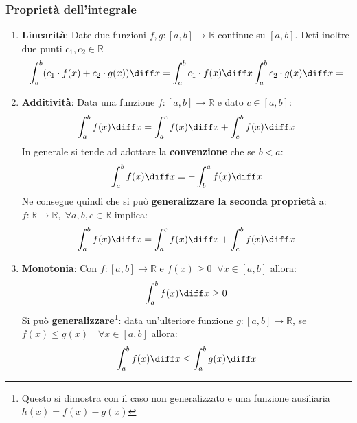 \subsubsection{Proprietà dell'integrale}
\begin{enumerate}
	\item \textbf{Linearità}: Date due funzioni $f,g:[a,b] \to \mathbb{R}$ 
        continue su $[a,b]$. Deti inoltre due punti $c_1, c_2 \in \mathbb{R}$
		\begin{equation*}
			\int_a^b (c_1 \cdot f(x) + c_2 \cdot g(x)) \diff x = \int_a^b c_1 
            \cdot f(x) \diff x \int_a^b c_2 \cdot g(x) \diff x = 
		\end{equation*}

	\item \textbf{Additività}: Data una funzione $f:[a,b] \to \mathbb{R}$ e dato 
        $c \in [a,b]$:
		\begin{equation*}
			\int_a^b f(x) \diff x = \int_a^c f(x) \diff x + \int_c^b f(x) 
            \diff x
		\end{equation*}
		In generale si tende ad adottare la \textbf{convenzione} che se 
        $b < a$:
		\begin{equation*}
			\int_a^b f(x) \diff x = -\int_b^a f(x) \diff x
		\end{equation*}
		Ne consegue quindi che si può \textbf{generalizzare la seconda 
        proprietà} a: $f:\mathbb{R} \to \mathbb{R},\; \forall a,b,c \in 
        \mathbb{R}$ implica:
		\begin{equation*}
			\int_a^b f(x) \diff x = \int_a^c f(x) \diff x + \int_c^b f(x) 
            \diff x 
		\end{equation*}

  \item \textbf{Monotonia}: Con $f:[a,b] \to \mathbb{R}$ e $f(x) \geq 0 \;\; 
    \forall x \in [a,b]$ allora:
		\begin{equation*}
			\int_a^b f(x) \diff x \geq 0
		\end{equation*}
		Si può \textbf{generalizzare}\footnote{Questo si dimostra con il caso 
        non generalizzato e una funzione ausiliaria $h(x) = f(x) - g(x)$}: data 
        un'ulteriore funzione $g:[a,b] \to \mathbb{R}$, se $f(x) \leq g(x) 
        \quad \forall x \in [a,b]$ allora:
		\begin{equation*}
			\int_a^b f(x) \diff x \leq \int_a^b g(x) \diff x
		\end{equation*}
\end{enumerate}

